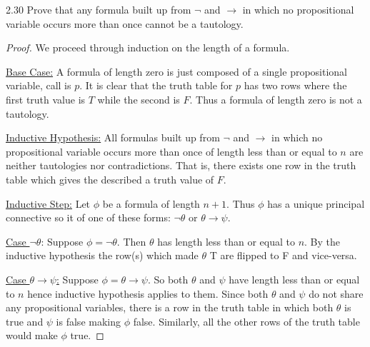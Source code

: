 \documentclass{article}
\theoremstyle{remark}\newtheorem{remark}{Remark}
\begin{document}
2.30 Prove that any formula built up from $\neg$ and $\to$ in which no propositional variable occurs more than once cannot be a tautology.

\begin{proof}
We proceed through induction on the length of a formula.

\underline{Base Case:} A formula of length zero is just composed of a single propositional variable, call is $p$. It is clear that the truth table for $p$ has two rows where the first truth value is $T$ while the second is $F$. Thus a formula of length zero is not a tautology.

\underline{Inductive Hypothesis:} All formulas built up from $\neg$ and $\to$ in which no propositional variable occurs more than once of length less than or equal to $n$ are neither tautologies nor contradictions. That is, there exists one row in the truth table which gives the described a truth value of $F$.

\underline{Inductive Step:} Let $\phi$ be a formula of length $n+1$. Thus $\phi$ has a unique principal connective so it of one of these forms: $\neg \theta$ or $\theta \to \psi$.

\underline{Case $\neg \theta$}: Suppose $\phi = \neg \theta$. Then $\theta$ has length less than or equal to $n$. By the inductive hypothesis the row(s) which made $\theta$ T are flipped to F and vice-versa.

\underline{Case $\theta \to \psi$:} Suppose $\phi = \theta \to \psi$. So both $\theta$ and $\psi$ have length less than or equal to $n$ hence inductive hypothesis applies to them. Since both $\theta$ and $\psi$ do not share any propositional variables, there is a row in the truth table in which both $\theta$ is true and $\psi$ is false making $\phi$ false. Similarly, all the other rows of the truth table would make $\phi$ true.

    
\end{proof}
\end{document}
